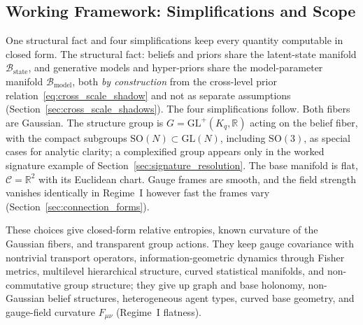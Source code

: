 \subsection{Working Framework: Simplifications and Scope}
\label{sec:working_framework}

One structural fact and four simplifications keep every quantity computable in closed form. The structural fact: beliefs and priors share the latent-state manifold $\mathcal{B}_{\mathrm{state}}$, and generative models and hyper-priors share the model-parameter manifold $\mathcal{B}_{\mathrm{model}}$, both \emph{by construction} from the cross-level prior relation~\eqref{eq:cross_scale_shadow} and not as separate assumptions (Section~\ref{sec:cross_scale_shadows}). The four simplifications follow. Both fibers are Gaussian. The structure group is $G = \mathrm{GL}^+(K_q, \mathbb{R})$ acting on the belief fiber, with the compact subgroups $\mathrm{SO}(N) \subset \mathrm{GL}(N)$, including $\mathrm{SO}(3)$, as special cases for analytic clarity; a complexified group appears only in the worked signature example of Section~\ref{sec:signature_resolution}. The base manifold is flat, $\mathcal{C} = \mathbb{R}^2$ with its Euclidean chart. Gauge frames are smooth, and the field strength vanishes identically in Regime~I however fast the frames vary (Section~\ref{sec:connection_forms}).

These choices give closed-form relative entropies, known curvature of the Gaussian fibers, and transparent group actions. They keep gauge covariance with nontrivial transport operators, information-geometric dynamics through Fisher metrics, multilevel hierarchical structure, curved statistical manifolds, and non-commutative group structure; they give up graph and base holonomy, non-Gaussian belief structures, heterogeneous agent types, curved base geometry, and gauge-field curvature $F_{\mu\nu}$ (Regime~I flatness).

